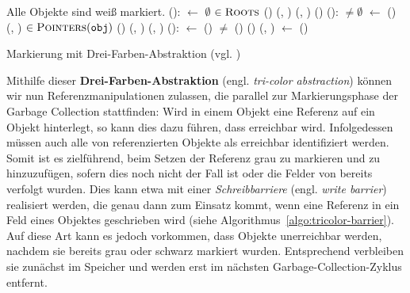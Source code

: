 \begin{algorithm}[h]
\begin{algorithmic}[1]
	\Pre Alle Objekte sind weiß markiert.
	\State {}():
	\State \quad {} $\gets$ $\emptyset$				
	\State \quad \FOREACH {} $\in \textsc{Roots}$
	\State \quad \quad \IF {}()
	\State \quad \quad \quad {}(, )	
	\State \quad \quad \quad {}(, )	
	\State \quad \quad \quad {}()
	\Statex
	\State {}():
	\State \quad \WHILE {} $\neq \emptyset$
	\State \quad \quad {} $\gets$ ()
	\State \quad \quad {}(, )		
	\State \quad \quad \FOREACH {} $\in \textsc{Pointers}(\texttt{obj})$
	\State \quad \quad \quad \IF {}()
	\State \quad \quad \quad \quad {}(, )	
	\State \quad \quad \quad \quad {}(, )
	\Statex
	\State {}():
	\State \quad {} $\gets$ ()
	\State \quad \WHILE {} $\neq$ \Null
	\State \quad \quad \IF {}()
	\State \quad \quad \quad {}()
	\State \quad \quad \ELSE {}(, )
	\State \quad \quad {} $\gets$ ()
\end{algorithmic}
\caption[Markierung mit Drei-Farben-Abstraktion]{Markierung mit Drei-Farben-Abstraktion (vgl. \cite[S. 970]{dijkstra1978})}
\label{algo:tricolor}
\end{algorithm}

Mithilfe dieser \textbf{Drei-Farben-Abstraktion} (engl. \textit{tri-color abstraction}) können wir nun Referenzmanipulationen zulassen, die parallel zur Markierungsphase der Garbage Collection stattfinden:
Wird in einem Objekt  eine Referenz auf ein Objekt  hinterlegt, so kann dies dazu führen, dass  erreichbar wird.
Infolgedessen müssen auch alle von  referenzierten Objekte als erreichbar identifiziert werden.
Somit ist es zielführend,  beim Setzen der Referenz grau zu markieren und zu  hinzuzufügen, sofern dies noch nicht der Fall ist oder die Felder von  bereits verfolgt wurden.
Dies kann etwa mit einer \textit{Schreibbarriere} (engl. \textit{write barrier}) realisiert werden, die genau dann zum Einsatz kommt, wenn eine Referenz in ein Feld eines Objektes geschrieben wird (siehe Algorithmus~\ref{algo:tricolor-barrier}).
Auf diese Art kann es jedoch vorkommen, dass Objekte unerreichbar werden, nachdem sie bereits grau oder schwarz markiert wurden.
Entsprechend verbleiben sie zunächst im Speicher und werden erst im nächsten Garbage-Collection-Zyklus entfernt.

